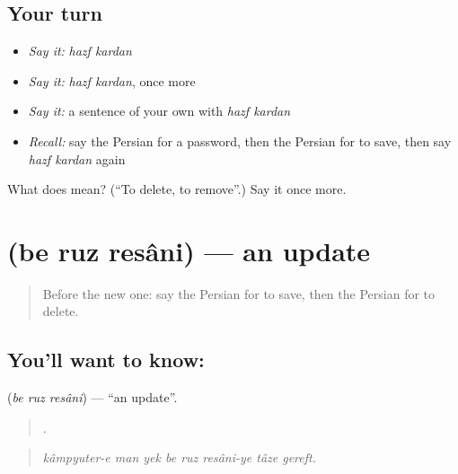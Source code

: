 \subsection*{Your turn}
\begin{itemize}
\raggedright
  \item \emph{Say it:} \emph{hazf kardan}
  \item \emph{Say it:} \emph{hazf kardan}, once more
  \item \emph{Say it:} a sentence of your own with \emph{hazf kardan}
  \item \emph{Recall:} say the Persian for a password, then the Persian for to save, then say \emph{hazf kardan} again
\end{itemize}

\begin{tcolorbox}[breakable,colback=teal!4,colframe=teal!35!black,title={Before you move on}]
What does   mean? (\textquotedblleft{}To delete, to remove\textquotedblright{}.) Say it once more.
\end{tcolorbox}
\section[\texorpdfstring{\fa{به} \fa{روز} \fa{رسانی} (be ruz resâni)}{به روز رسانی (be ruz resâni)}]{   (be ruz resâni) — an update}

\label{lesson:FA-C416-be-ruz-resani}



\begin{quote}
Before the new one: say the Persian for to save, then the Persian for to delete.
\end{quote}

\subsection*{You'll want to know:   }
\textbf{  } (\emph{be ruz resâni}) — \textquotedblleft{}an update\textquotedblright{}.

\begin{quote}
       .
\end{quote}

\begin{quote}
\emph{kâmpyuter-e man yek be ruz resâni-ye tâze gereft.}
\end{quote}


